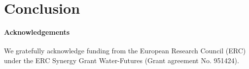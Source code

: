 \documentclass[runningheads]{llncs}
\begin{document}
\section{Conclusion}
\label{sec:conclusion}


\paragraph{Acknowledgements}
We gratefully acknowledge funding from the European Research Council (ERC)
under the ERC Synergy Grant Water-Futures (Grant agreement No. 951424).
%
%


%
\end{document}
